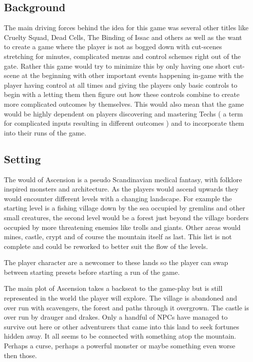 \documentclass[a4paper,10pt,english]{article}
\begin{document}
\subsection*{Background}
The main driving forces behind the idea for this game was several other titles like Cruelty Squad, Dead Cells, The Binding of Issac and others as well as the want to create a game where the player is not as bogged down with cut-scenes stretching for minutes, complicated menus and control schemes right out of the gate. Rather this game would try to minimize this by only having one short cut-scene at the beginning with other important events happening in-game with the player having control at all times and giving the players only basic controls to begin with a letting them then figure out how these controls combine to create more complicated outcomes by themselves. This would also mean that the game would be highly dependent on players discovering and mastering Techs ( a term for complicated inputs resulting in different outcomes ) and to incorporate them into their runs of the game.

\subsection*{Setting}
The would of Ascension is a pseudo Scandinavian medical fantasy, with folklore inspired monsters and architecture. As the players would ascend upwards they would encounter different levels with a changing landscape. For example the starting level is a fishing village down by the sea occupied by gremlins and other small creatures, the second level would be a forest just beyond the village borders occupied by more threatening enemies like trolls and giants. Other areas would mines, castle, crypt and of course the mountain itself as last. This list is not complete and could be reworked to better suit the flow of the levels.

The player character are a newcomer to these lands so the player can swap between starting presets before starting a run of the game.

The main plot of Ascension takes a backseat to the game-play but is still represented in the world the player will explore. The village is abandoned and over run with scavengers, the forest and paths through it overgrown. The castle is over run by drauger and drakes. Only a handful of NPCs have managed to survive out here or other adventurers that came into this land to seek fortunes hidden away. It all seems to be connected with something atop the mountain. Perhaps a curse, perhaps a powerful monster or maybe something even worse then those. 
\end{document}
